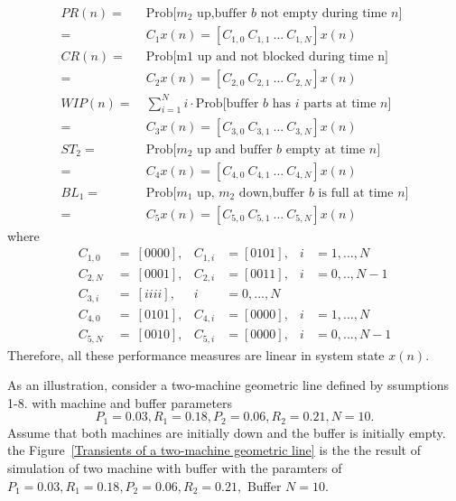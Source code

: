\begin{equation}
	\begin{aligned}
		PR(n)=&\  \text{Prob[$m_2$ up,buffer $b$ not empty during time $n$] }\\
		=&\ C_1x(n)=[C_{1,0}\ C_{1,1}\ ...\ C_{1,N}]x(n) \\
		CR(n)=&\ \text{Prob[m1 up and not blocked during time n]} \\
		=&\ C_2x(n)=[C_{2,0}\ C_{2,1}\ ...\ C_{2,N}]x(n)\\
		WIP(n)=&\ \sum_{i=1}^N i \cdot \text{Prob[buffer $b$ has $i$ parts at time $n$]} \\
		=&\ C_3x(n)=[C_{3,0}\ C_{3,1}\ ...\ C_{3,N}]x(n) \\
		ST_2=&\ \text{Prob[$m_2$ up and buffer $b$ empty at time $n$]} \\
		=&\ C_4x(n)=[C_{4,0}\ C_{4,1}\ ...\ C_{4,N}]x(n) \\
		BL_1=&\ \text{Prob[$m_1$ up, $m_2$ down,buffer $b$ is full at time $n$]} \\
		=&\  C_5x(n)=[C_{5,0}\ C_{5,1}\ ...\ C_{5,N}]x(n)
	\end{aligned}
\end{equation}
where
\begin{equation}
    \begin{aligned}
        C_{1,0}\ &= \ [0 0 0 0],  &C_{1,i}&= [0 1 0 1],  &i&= 1,...,N \\
        C_{2,N}\ &=\ [0 0 0 1],  &C_{2,i}&= [0 0 1 1],  &i&= 0,..,N-1 \\
        C_{3,i}\ &=\ [i i i i],  &i&=  0,...,N \\
        C_{4,0}\ &=\ [0 1 0 1],  &C_{4,i}&= [0 0 0 0],  &i&= 1,...,N  \\
        C_{5,N}\ &=\ [0 0 1 0],  &C_{5,i}&= [0 0 0 0],  &i&= 0,...,N-1
    \end{aligned}
\end{equation}
Therefore, all these performance measures are linear in system state $x(n)$.

As an illustration, consider a two-machine geometric line defined by ssumptions 1-8. with machine and buffer parameters
\begin{displaymath}
	P_1=0.03, R_1=0.18, P_2=0.06, R_2=0.21, N=10.
\end{displaymath}
Assume that both machines are initially down and the buffer is initially empty. 
the Figure~\ref{Transients of a two-machine geometric line} is the the result of simulation of two machine with buffer with the paramters of $P_1 = 0.03, R_1 = 0.18, P_2 = 0.06, R_2 = 0.21,$ Buffer $ N = 10$.


